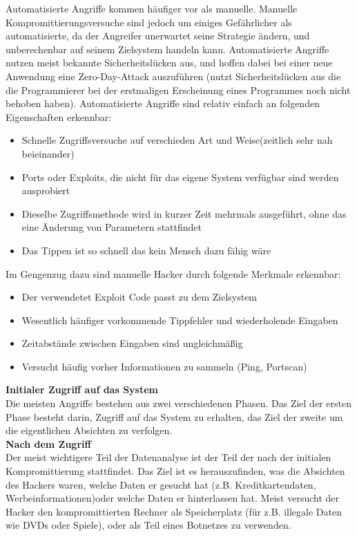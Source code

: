 \noindent Automatisierte Angriffe kommen häufiger vor als manuelle. Manuelle Kompromittierungsversuche sind jedoch um einiges Gefährlicher als automatisierte, da der Angreifer unerwartet seine Strategie ändern, und unberechenbar auf seinem Zielsystem handeln kann. Automatisierte Angriffe nutzen meist bekannte Sicherheitslücken aus, und hoffen dabei bei einer neue Anwendung eine Zero-Day-Attack auszuführen (nutzt Sicherheitslücken aus die die Programmierer bei der erstmaligen Erscheinung eines Programmes noch nicht behoben haben). 
Automatisierte Angriffe sind relativ einfach an folgenden Eigenschaften erkennbar:
\begin{itemize}
\item Schnelle Zugriffsversuche auf verschieden Art und Weise(zeitlich sehr nah beieinander)
\item Ports oder Exploits, die nicht für das eigene System verfügbar sind werden ausprobiert
\item Dieselbe Zugriffsmethode wird in kurzer Zeit mehrmals ausgeführt, ohne das eine Änderung von Parametern stattfindet
\item Das Tippen ist so schnell das kein Mensch dazu fähig wäre 
\end{itemize}

\noindent Im Gengenzug dazu sind manuelle Hacker durch folgende Merkmale erkennbar:

\begin{itemize}
\item Der verwendetet Exploit Code passt zu dem Zielsystem
\item Wesentlich häufiger vorkommende Tippfehler und wiederholende Eingaben
\item Zeitabstände zwischen Eingaben sind ungleichmäßig
\item Versucht häufig vorher Informationen zu sammeln (Ping, Portscan)
\end{itemize}

\noindent \textbf{Initialer Zugriff auf das System}\\
Die meisten Angriffe bestehen aus zwei verschiedenen Phasen. Das Ziel der ersten Phase besteht darin, Zugriff auf das System zu erhalten, das Ziel der zweite um die eigentlichen Absichten zu verfolgen.\\

\noindent \textbf{Nach dem Zugriff}\\
Der meist wichtigere Teil der Datenanalyse ist der Teil der nach der initialen Kompromittierung stattfindet. Das Ziel ist es herauszufinden, was die Absichten des Hackers waren, welche Daten er gesucht hat (z.B. Kreditkartendaten, Werbeinformationen)oder welche Daten er hinterlassen hat. Meist versucht der Hacker den kompromittierten Rechner als Speicherplatz (für z.B. illegale Daten wie DVDs oder Spiele), oder als Teil eines Botnetzes zu verwenden. \\

